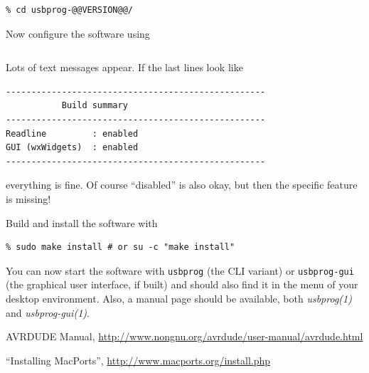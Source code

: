 \documentclass[bibtotoc,UKenglish,halfparskip,oneside,DIV12]{scrreprt}
\begin{document}
\begin{lstlisting}[style=inline]
% tar xvfj usbprog-@@VERSION@@.tar.bz2
% cd usbprog-@@VERSION@@/
\end{lstlisting}

Now configure the software using

\begin{lstlisting}[style=inline]
% ./configure
\end{lstlisting}

Lots of text messages appear. If the last lines look like

\begin{lstlisting}[style=inline]
---------------------------------------------------
           Build summary
---------------------------------------------------
Readline         : enabled
GUI (wxWidgets)  : enabled
---------------------------------------------------
\end{lstlisting}

everything is fine. Of course ``disabled'' is also okay, but then the specific feature is missing!

Build and install the software with

\begin{lstlisting}[style=inline]
% make
% sudo make install # or su -c "make install"
\end{lstlisting}

You can now start the software with \texttt{usbprog} (the CLI variant) or \texttt{usbprog-gui} (the
graphical user interface, if built) and should also find it in the menu of your desktop environment.
Also, a manual page should be available, both \emph{usbprog(1)} and \emph{usbprog-gui(1)}.







\begin{thebibliography}{99}
   AVRDUDE Manual,
    \url{http://www.nongnu.org/avrdude/user-manual/avrdude.html}

   ``Installing MacPorts'', \url{http://www.macports.org/install.php}
\end{thebibliography}
\end{document}
